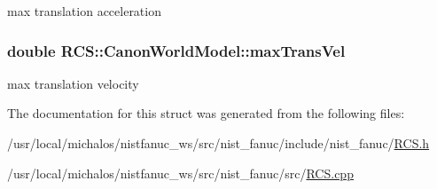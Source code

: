 max translation acceleration \hypertarget{structRCS_1_1CanonWorldModel_a55824e72d1d92c8b5f5c8ecf3b7c7a00}{
\subsubsection[{max\-Trans\-Vel}]{\setlength{\rightskip}{0pt plus 5cm}double R\-C\-S\-::\-Canon\-World\-Model\-::max\-Trans\-Vel}}\label{structRCS_1_1CanonWorldModel_a55824e72d1d92c8b5f5c8ecf3b7c7a00}
max translation velocity 

The documentation for this struct was generated from the following files\-:\begin{DoxyCompactItemize}
\item 
/usr/local/michalos/nistfanuc\-\_\-ws/src/nist\-\_\-fanuc/include/nist\-\_\-fanuc/\hyperlink{RCS_8h}{R\-C\-S.\-h}\item 
/usr/local/michalos/nistfanuc\-\_\-ws/src/nist\-\_\-fanuc/src/\hyperlink{RCS_8cpp}{R\-C\-S.\-cpp}\end{DoxyCompactItemize}

